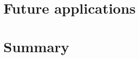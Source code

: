 \begin{figure}
    \centering
    \label{fig:JAX_Layer2_Taus}
\end{figure}

\section{Future applications} %

\section*{Summary} %